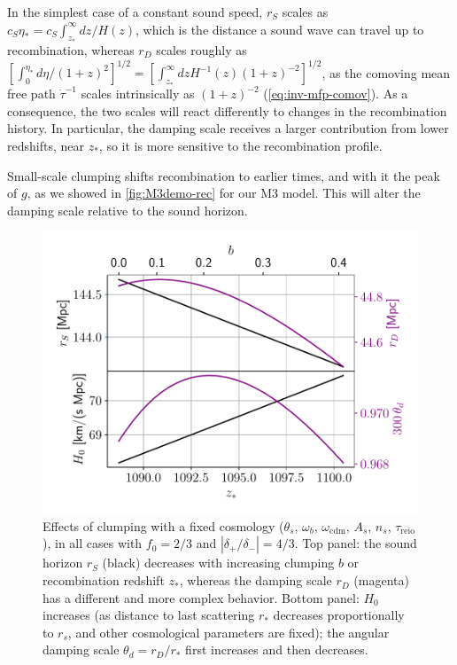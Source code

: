 In the simplest case of a constant sound speed, $r_S$ scales as $c_S \eta_*= c_S \int_{z_*}^\infty dz/H(z)$, which is the distance a sound wave can travel up to recombination, 
whereas $r_D$ scales roughly as $\left[\int_0^{\eta_*} d\eta/(1+z)^2\right]^{1/2}=\left[\int_{z_*}^\infty dzH^{-1}(z)(1+z)^{-2}\right]^{1/2}$, as the comoving mean free path $\dot\tau^{-1}$ scales intrinsically as $(1+z)^{-2}$ (\cref{eq:inv-mfp-comov}). 
As a consequence, the two scales will react differently to changes in the recombination history.
In particular, the damping scale receives a larger contribution from lower redshifts, near $z_*$, so it is more sensitive to the recombination profile.

Small-scale clumping shifts recombination to earlier times, and with it the peak of $g$,
as we showed in \cref{fig:M3demo-rec} for our M3 model. 
This will alter the damping scale relative to the sound horizon.

\begin{figure}[ht!]
\includegraphics[width=\columnwidth]{img/clumping-correlations.pdf}
\caption[Effects of clumping with a fixed cosmology]{Effects of clumping with a fixed cosmology ($\theta_s$, $\omega_b$, $\omega_\mathrm{cdm}$, $A_s$, $n_s$, $\tau_\mathrm{reio}$), in all cases with $f_0=2/3$ and $\left| \delta_+/\delta_- \right|=4/3$.
Top panel: the sound horizon $r_S$ (black) decreases with increasing clumping $b$ or recombination redshift $z_*$, whereas the damping scale $r_D$ (magenta) has a different and more complex behavior.
Bottom panel: $H_0$ increases (as distance to last scattering $r_*$ decreases proportionally to $r_s$, and other cosmological parameters are fixed); the angular damping scale $\theta_d=r_D/r_*$ first increases and then decreases.}
\label{fig:clumping-correlations}
\end{figure}

